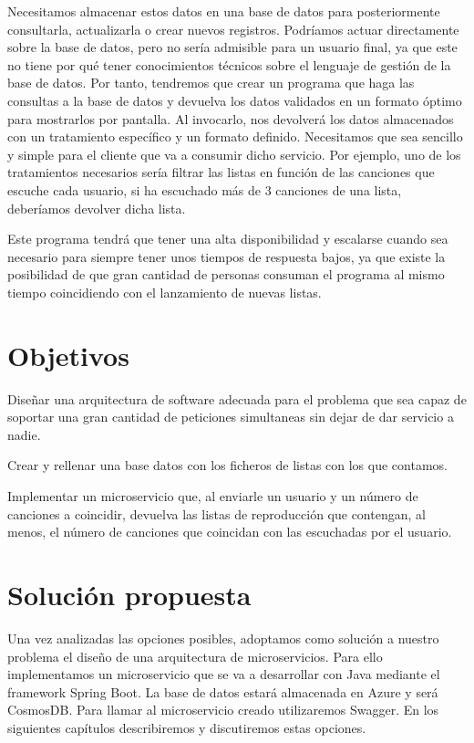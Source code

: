 \documentclass[12pt]{report} %
\begin{document}
	Necesitamos almacenar estos datos en una base de datos para posteriormente consultarla, actualizarla o crear nuevos registros. 
	Podríamos actuar directamente sobre la base de datos, pero no sería admisible para un usuario final, ya que este no tiene por qué tener conocimientos técnicos sobre el lenguaje de gestión de la base de datos.
	Por tanto, tendremos que crear un programa que haga las consultas a la base de datos y devuelva los datos validados en un formato óptimo para mostrarlos por pantalla. Al invocarlo, nos devolverá los datos almacenados con un tratamiento específico y un formato definido. Necesitamos que sea sencillo y simple para el cliente que va a consumir dicho servicio. 
	Por ejemplo, uno de los tratamientos necesarios sería filtrar las listas en función de las canciones que escuche cada usuario, si ha escuchado más de 3 canciones de una lista, deberíamos devolver dicha lista.
		
	Este programa tendrá que tener una alta disponibilidad y escalarse cuando sea necesario para siempre tener unos tiempos de respuesta bajos, ya que existe la posibilidad de que gran cantidad de personas consuman el programa al mismo tiempo coincidiendo con el lanzamiento de nuevas listas.
	
	\section{Objetivos}
		
	Diseñar una arquitectura de software adecuada para el problema que sea capaz de soportar una gran cantidad de peticiones simultaneas sin dejar de dar servicio a nadie.
	
	Crear y rellenar una base datos con los ficheros de listas con los que contamos.
	
	Implementar un microservicio que, al enviarle un usuario y un número de canciones a coincidir, devuelva las listas de reproducción que contengan, al menos, el número de canciones que coincidan con las escuchadas por el usuario.
	
	
	\section{Solución propuesta}
	Una vez analizadas las opciones posibles, adoptamos como solución a nuestro problema el diseño de una arquitectura de microservicios.
	Para ello implementamos un microservicio que se va a desarrollar con Java mediante el framework Spring Boot.
	La base de datos estará almacenada en Azure y será CosmosDB.
	Para llamar al microservicio creado utilizaremos Swagger. En los siguientes capítulos describiremos y discutiremos estas opciones.
	
\end{document}
